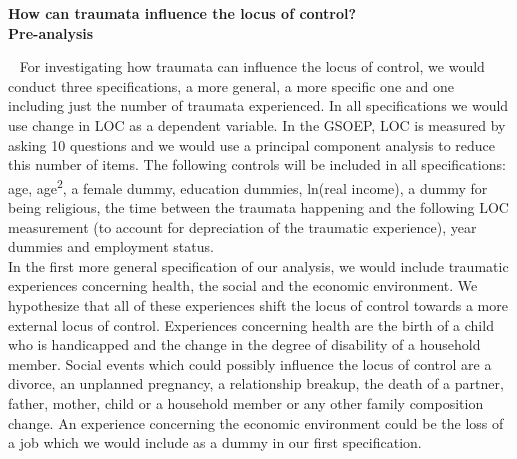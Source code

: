 \documentclass[11pt,a4paper,leqno]{article}
\theoremstyle{definition}
\begin{document}
\begin{center}
    \begin{large}
        \textbf{
        How can traumata influence the locus of control?\\
        Pre-analysis \\[2ex]}
    \end{large}
\end{center}

   ~ %
   For investigating how traumata can influence the locus of control, we would conduct three specifications, a more general, a more specific one and one including just the number of traumata experienced. In all specifications we would use change in LOC as a dependent variable. In the GSOEP, LOC is measured by asking 10 questions and we would use a principal component analysis to reduce this number of items. The following controls will be included in all specifications: age, age\textsuperscript{2}, a female dummy, education dummies, ln(real income), a dummy for being religious, the time between the traumata happening and the following LOC measurement (to account for depreciation of the traumatic experience), year dummies and employment status. \\
   
   In the first more general specification of our analysis, we would include traumatic experiences concerning health, the social and the economic environment. We hypothesize that all of these experiences shift the locus of control towards a more external locus of control. Experiences concerning health are the birth of a child who is handicapped and the change in the degree of disability of a household member. Social events which could possibly influence the locus of control are a divorce, an unplanned pregnancy, a relationship breakup, the death of a partner, father, mother, child or a household member or any other family composition change. An experience concerning the economic environment could be the loss of a job which we would include as a dummy in our first specification.\\
   
\end{document}
